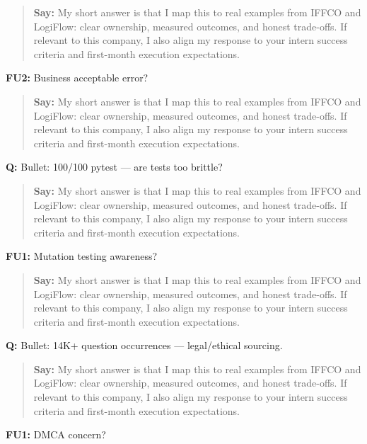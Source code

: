 \documentclass[9pt,a4paper]{article}
\begin{document}
\begin{quote}\small\textbf{Say:} My short answer is that I map this to real examples from IFFCO and LogiFlow: clear ownership, measured outcomes, and honest trade-offs. If relevant to this company, I also align my response to your intern success criteria and first-month execution expectations.\end{quote}
\vspace{2mm}
\textbf{FU2:} Business acceptable error?

\begin{quote}\small\textbf{Say:} My short answer is that I map this to real examples from IFFCO and LogiFlow: clear ownership, measured outcomes, and honest trade-offs. If relevant to this company, I also align my response to your intern success criteria and first-month execution expectations.\end{quote}
\vspace{2mm}
\textbf{Q:} Bullet: 100/100 pytest --- are tests too brittle?

\begin{quote}\small\textbf{Say:} My short answer is that I map this to real examples from IFFCO and LogiFlow: clear ownership, measured outcomes, and honest trade-offs. If relevant to this company, I also align my response to your intern success criteria and first-month execution expectations.\end{quote}
\vspace{2mm}
\textbf{FU1:} Mutation testing awareness?

\begin{quote}\small\textbf{Say:} My short answer is that I map this to real examples from IFFCO and LogiFlow: clear ownership, measured outcomes, and honest trade-offs. If relevant to this company, I also align my response to your intern success criteria and first-month execution expectations.\end{quote}
\vspace{2mm}
\textbf{Q:} Bullet: 14K+ question occurrences --- legal/ethical sourcing.

\begin{quote}\small\textbf{Say:} My short answer is that I map this to real examples from IFFCO and LogiFlow: clear ownership, measured outcomes, and honest trade-offs. If relevant to this company, I also align my response to your intern success criteria and first-month execution expectations.\end{quote}
\vspace{2mm}
\textbf{FU1:} DMCA concern?
\end{document}
